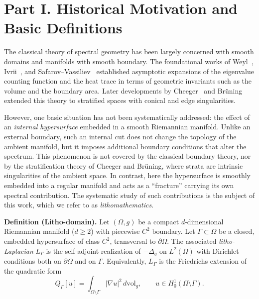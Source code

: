 \section*{Part I. Historical Motivation and Basic Definitions}

\noindent
The classical theory of spectral geometry has been largely concerned with smooth domains and manifolds with smooth boundary. The foundational works of Weyl~\cite{Weyl11}, Ivrii~\cite{Ivrii80}, and Safarov--Vassiliev~\cite{SafarovVassiliev97} established asymptotic expansions of the eigenvalue counting function and the heat trace in terms of geometric invariants such as the volume and the boundary area. Later developments by Cheeger~\cite{Cheeger83} and Brüning~\cite{Bruening84} extended this theory to stratified spaces with conical and edge singularities. 

However, one basic situation has not been systematically addressed: the effect of an \emph{internal hypersurface} embedded in a smooth Riemannian manifold. Unlike an external boundary, such an internal cut does not change the topology of the ambient manifold, but it imposes additional boundary conditions that alter the spectrum. This phenomenon is not covered by the classical boundary theory, nor by the stratification theory of Cheeger and Brüning, where strata are intrinsic singularities of the ambient space. In contrast, here the hypersurface is smoothly embedded into a regular manifold and acts as a ``fracture'' carrying its own spectral contribution. The systematic study of such contributions is the subject of this work, which we refer to as \emph{lithomathematics}.

\medskip
\noindent
\textbf{Definition (Litho-domain).} 
Let $(\Omega,g)$ be a compact $d$-dimensional Riemannian manifold ($d \geq 2$) with piecewise $C^2$ boundary. Let $\Gamma \subset \Omega$ be a closed, embedded hypersurface of class $C^2$, transversal to $\partial \Omega$. The associated \emph{litho-Laplacian} $L_\Gamma$ is the self-adjoint realization of $-\Delta_g$ on $L^2(\Omega)$ with Dirichlet conditions both on $\partial \Omega$ and on $\Gamma$. Equivalently, $L_\Gamma$ is the Friedrichs extension of the quadratic form
\[
Q_\Gamma[u] = \int_{\Omega \setminus \Gamma} |\nabla u|^2 \, d\mathrm{vol}_g, 
\qquad 
u \in H^1_0(\Omega \setminus \Gamma).
\]

